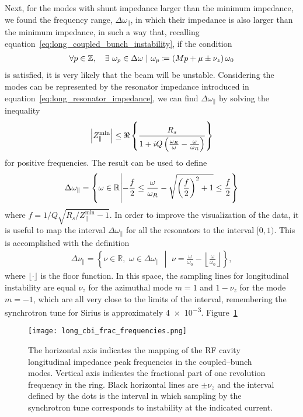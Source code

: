     Next, for the modes with shunt impedance larger than the minimum impedance, we found the frequency range, $\Delta\omega_\parallel$, in which their impedance is also larger than the minimum impedance, in such a way that, recalling equation~\eqref{eq:long_coupled_bunch_instability}, if the condition
    \begin{align}
        \left.\forall p \in \mathbb{Z},\quad \exists\,\, \omega_p \in \Delta \omega \,\, \middle| \,\, \omega_p \coloneqq \left(Mp + \mu \pm \nu_z\right)\omega_0\right.
    \end{align}
    is satisfied, it is very likely that the beam will be unstable. Considering the modes can be represented by the resonator impedance introduced in equation~\eqref{eq:long_resonator_impedance}, we can find $\Delta\omega_\parallel$ by solving the inequality
    \begin{align}
        \left|Z_\parallel^\text{min}\right| \le \Re\left\{\frac{R_s}{1 + iQ\left(\frac{\omega_R}{\omega}-\frac{\omega}{\omega_R}\right)}\right\}
    \end{align}
    for positive frequencies. The result can be used to define
    \begin{align}
        \Delta\omega_\parallel = \left\{\omega \in \mathbb{R} \middle| -\frac{f}{2} \le \frac{\omega}{\omega_R} - \sqrt{\left(\frac{f}{2}\right)^2+1} \le
        \frac{f}{2} \right\}
    \end{align}
    where $f = 1/Q\sqrt{R_s/Z_\parallel^\text{min}-1}$. In order to improve the visualization of the data, it is useful to map the interval $\Delta\omega_\parallel$ for all the resonators to the interval $[0,1)$. This is accomplished with the definition
    \begin{align}\label{eq:cbi_frac_frequencies}
        \Delta\nu_\parallel = \left\{\nu \in \mathbb{R},\,\,\omega \in \Delta\omega_\parallel\,\, \middle|\,\,
        \nu=\frac{\omega}{\omega_0} - \left\lfloor\frac{\omega}{\omega_0}\right\rfloor \right\},
    \end{align}
    where $\lfloor\cdot\rfloor$ is the floor function. In this space, the sampling lines for longitudinal instability are equal $\nu_z$ for the azimuthal mode $m=1$ and $1 - \nu_z$ for the mode $m=-1$, which are all very close to the limits of the interval, remembering the synchrotron tune for Sirius is approximately \num{4e-3}.
    Figure~\ref{fig:long_cbi_frac_frequencies}
    \begin{figure}
        \centering
        \texttt{[image: long\_cbi\_frac\_frequencies.png]}
        \caption{The horizontal axis indicates the mapping of the RF cavity longitudinal impedance peak frequencies in the coupled--bunch modes. Vertical axis indicates the fractional part of one revolution frequency in the ring. Black horizontal lines are $\pm\nu_z$ and the interval defined by the dots is the interval in which sampling by the synchrotron tune corresponds to instability at the indicated current.}
        \label{fig:long_cbi_frac_frequencies}
    \end{figure}

